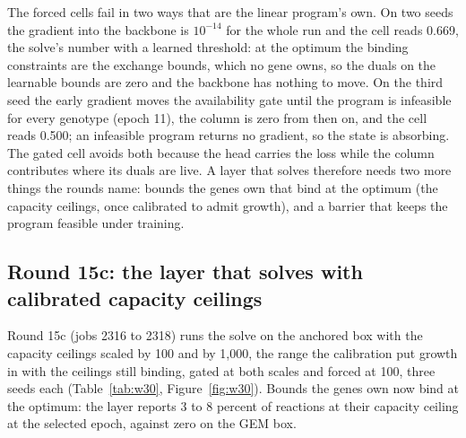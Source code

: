 The forced cells fail in two ways that are the linear program's own. On two seeds the
gradient into the backbone is $10^{-14}$ for the whole run and the cell reads 0.669, the
solve's number with a learned threshold: at the optimum the binding constraints are the
exchange bounds, which no gene owns, so the duals on the learnable bounds are zero and
the backbone has nothing to move. On the third seed the early gradient moves the
availability gate until the program is infeasible for every genotype (epoch 11), the
column is zero from then on, and the cell reads 0.500; an infeasible program returns no
gradient, so the state is absorbing. The gated cell avoids both because the head
carries the loss while the column contributes where its duals are live. A layer that
solves therefore needs two more things the rounds name: bounds the genes own that bind
at the optimum (the capacity ceilings, once calibrated to admit growth), and a barrier
that keeps the program feasible under training.

\subsection{Round 15c: the layer that solves with calibrated capacity ceilings}

Round 15c (jobs 2316 to 2318) runs the solve on the anchored box with the capacity
ceilings scaled by 100 and by 1,000, the range the calibration put growth in with the
ceilings still binding, gated at both scales and forced at 100, three seeds each
(Table~\ref{tab:w30}, Figure~\ref{fig:w30}). Bounds the genes own now bind at the
optimum: the layer reports 3 to 8 percent of reactions at their capacity ceiling at the
selected epoch, against zero on the GEM box.




